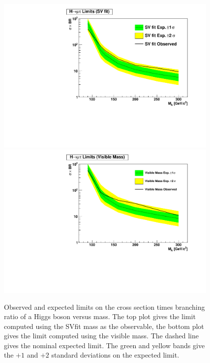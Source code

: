 %
\begin{figure}[t]
\begin{center}
  \includegraphics*[width=0.97\textwidth]{results_chapter/figures/expected_vs_obs_SVfit.pdf}
  \includegraphics*[width=0.97\textwidth]{results_chapter/figures/expected_vs_obs_VisibleMass.pdf}
  \caption[Observed and expected limits on Higgs boson $\sigma \times \text{BR}$]
  {Observed and expected limits on the cross section times branching ratio of a
  Higgs boson versus mass.  The top plot gives the limit computed using
  the SVfit mass as the observable, the bottom plot gives the limit computed
  using the visible mass.  The dashed line gives the nominal expected limit.
  The green and yellow bands give the $+1$ and $+2$ standard deviations on the
  expected limit.  } \label{fig:SVXSecLimits}
\end{center}
\end{figure} 
